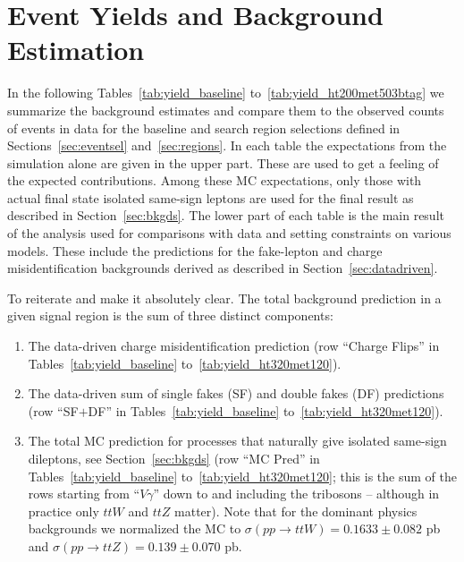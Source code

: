 \section{Event Yields and Background Estimation}
\label{sec:yields}

In the following Tables~\ref{tab:yield_baseline} 
to~\ref{tab:yield_ht200met503btag}
we summarize the background 
estimates and compare them to the
observed counts of events in data for the baseline and search region selections
defined in Sections~\ref{sec:eventsel} and~\ref{sec:regions}.
In each table the expectations from the simulation alone are given 
in the upper part.
 These are used to get a feeling of the expected contributions.
Among these MC expectations, 
only those with actual final state 
isolated same-sign leptons are used for the final result
as described in Section~\ref{sec:bkgds}.
The lower part of each table is the main result of the analysis
used for comparisons with data and setting constraints on various models.
These include the predictions for the fake-lepton and charge misidentification
backgrounds derived as described in Section~\ref{sec:datadriven}.

To reiterate and make it absolutely clear.  The total background
prediction in a given signal region
is the sum of three distinct components:
\begin{enumerate}

\item The data-driven charge misidentification prediction (row ``Charge Flips'' in
Tables~\ref{tab:yield_baseline} to~\ref{tab:yield_ht320met120}).

\item The data-driven sum of single fakes (SF) and double fakes
(DF) predictions (row ``SF$+$DF''
in Tables~\ref{tab:yield_baseline} to~\ref{tab:yield_ht320met120}).

\item The total MC prediction for processes that naturally give isolated
same-sign dileptons, see Section~\ref{sec:bkgds} (row ``MC Pred'' in
Tables~\ref{tab:yield_baseline} to~\ref{tab:yield_ht320met120};
this is the sum of the rows starting from ``$V\gamma$'' down to 
and including the tribosons -- although in practice only $ttW$ and 
$ttZ$ matter).  Note that for the dominant physics 
backgrounds we normalized the MC to $\sigma(pp \to ttW) = 0.1633 \pm 0.082$
pb and $\sigma(pp \to ttZ) = 0.139 \pm 0.070$ pb.

\end{enumerate}

